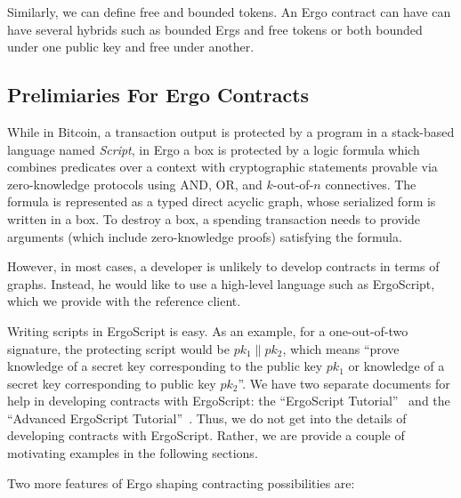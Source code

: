  Similarly, we can define free and bounded tokens. An Ergo contract can have can have several hybrids such as bounded Ergs and free tokens or both bounded under one public key and free under another. 

\subsection{Prelimiaries For Ergo Contracts}

  While in Bitcoin, a transaction output is protected by a program in a stack-based language named {\em Script}, in Ergo a box is protected by a logic formula which combines predicates over a context with cryptographic statements provable via zero-knowledge protocols using AND, OR, and $k$-out-of-$n$ connectives. The formula is represented as a typed direct
 acyclic graph, whose serialized form is written in a box. To destroy a box, a spending transaction needs to provide arguments (which include zero-knowledge proofs) satisfying the formula.

 However, in most cases, a developer is unlikely to develop contracts in terms of graphs. Instead, he would like to use a high-level language such as ErgoScript, which we provide with the reference client. 
 
 Writing scripts in ErgoScript is easy. As an
 example, for a one-out-of-two signature, the protecting script would be ${pk_1 \|pk_2}$, which means ``prove knowledge of
 a secret key corresponding to the public key $pk_1$ or knowledge of a secret key corresponding to public key $pk_2$''. We have
 two separate documents for help in developing contracts with ErgoScript: the ``ErgoScript Tutorial''~\cite{ergoTutorial}
 and the ``Advanced ErgoScript Tutorial''~\cite{ergoAdvTutorial}. Thus, we do not get into the details of developing contracts with ErgoScript. Rather, we are provide a couple of motivating examples in the following sections.

Two more features of Ergo shaping contracting possibilities are:

